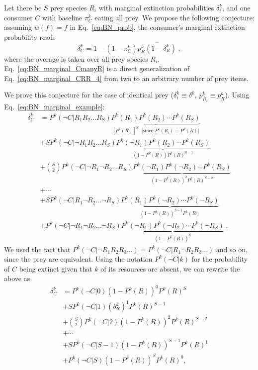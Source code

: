 \documentclass[11pt]{article}
\newcommand{\ol}[1]{\overline{#1}}
\begin{document}
Let there be $S$ prey species $R_i$ with marginal extinction probabilities $\delta_i^k$, and one consumer $C$ with baseline $\pi_C^k$ eating all prey. We propose the following conjecture: assuming $w(f)=f$ in Eq.~\ref{eq:BN_prob}, the consumer's marginal extinction probability reads
\begin{equation}
  \label{eq:BN_marginal_CmanyR}
  \delta_C^k = 1 - (1 - \pi_C^k) \ol{p_R^k (1 - \delta_R^k)} \ ,
\end{equation}
where the average is taken over all prey species $R_i$. Eq.~\ref{eq:BN_marginal_CmanyR} is a direct generalization of Eq.~\ref{eq:BN_marginal_CRR_4} from two to an arbitrary number of prey items.

We prove this conjecture for the case of identical prey ($\delta_i^k \equiv \delta^k$, $p_{R_i}^k \equiv p_R^k$). Using Eq.~\ref{eq:BN_marginal_example}:
\begin{align}
  \label{eq:BN_marginal_twolayer}
  \delta_C^k &= P^k(\neg C|R_1 R_2 \ldots R_S) \underbrace{P^k(R_1)
               P^k(R_2) \cdots P^k(R_S)}_{[P^k(R)]^S \;
               \text{ [since $P^k(R_i) \equiv P^k(R)$]}}
    \nonumber \\ &+ S P^k(\neg C|\neg R_1 R_2 \ldots R_S)
    \underbrace{P^k(\neg R_1) P^k(R_2) \cdots P^k(R_S)}_{(1-P^k(R)) P^k(R)^{S-1}}
    \\ &+ \binom{S}{2} P^k(\neg C|\neg R_1 \neg R_2 \ldots R_S)
    \underbrace{P^k(\neg R_1) P^k(\neg R_2) \cdots P^k(R_S)}_{(1-P^k(R))^2 P^k(R)^{S-2}}
    \nonumber \\ &+ \cdots
    \nonumber \\ &+ S P^k(\neg C|R_1 \neg R_2 \ldots \neg R_S)
    \underbrace{P^k(R_1) P^k(\neg R_2) \cdots P^k(\neg R_S)}_{(1-P^k(R))^{S-1} P^k(R)}
    \nonumber \\ &+ P^k(\neg C|\neg R_1 \neg R_2 \ldots \neg R_S)
    \underbrace{P^k(\neg R_1) P^k(\neg R_2) \cdots P^k(\neg R_S)}_{(1-P^k(R))^{S}} \ .
                   \nonumber
\end{align}
We used the fact that $P^k(\neg C|\neg R_1 R_2 R_3 \ldots) = P^k(\neg C|R_1 \neg R_2 R_3 \ldots)$ and so on, since the prey are equivalent. Using the notation $P^k(\neg C|k)$ for the probability of $C$ being extinct given that $k$ of its resources are absent, we can rewrite the above as
\begin{equation}
  \label{eq:BN_marginal_twolayer_2}
  \begin{split}
    \delta_C^k &= P^k(\neg C|0) (1-P^k(R))^{0} P^k(R)^{S}
    \\ &+ S P^k(\neg C|1) (b_R^k)^{1} P^k(R)^{S-1}
    \\ &+ \binom{S}{2} P^k(\neg C|2) (1-P^k(R))^{2} P^k(R)^{S-2}
    \\ &+ \cdots
    \\ &+ S P^k(\neg C|S-1) (1-P^k(R))^{S-1} P^k(R)^{1}
    \\ &+ P^k(\neg C|S) (1-P^k(R))^{S} P^k(R)^{0} ,
  \end{split}
\end{equation}
\end{document}
